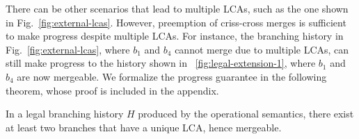 There can be other scenarios that lead to multiple LCAs, such as the
one shown in Fig.~\ref{fig:external-lcas}. However, preemption of
criss-cross merges is sufficient to make progress despite multiple
LCAs. For instance, the branching history in
Fig.~\ref{fig:external-lcas}, where $b_1$ and $b_4$ cannot merge due
to multiple LCAs, can still make progress to the history shown in
~\ref{fig:legal-extension-1}, where $b_1$ and $b_4$ are now mergeable.
We formalize the progress guarantee in the following theorem, whose
proof is included in the appendix.

\begin{theorem} 
In a legal branching history $H$ produced by the operational
semantics, there exist at least two branches that have a unique LCA,
hence mergeable.
\end{theorem}
